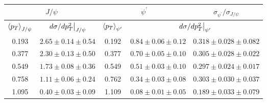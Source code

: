 \begin{tabular}{cc|ccc}
\hline
\multicolumn{2}{c|}{$J/\psi$}                     & \multicolumn{2}{c|}{$\psi^{\prime}$}                                   & $\sigma_{\psi^\prime}/\sigma_{J/\psi}$ \\ \hline
$\expval{p_T}_{J/\psi}$ & $\eval{d\sigma/dp_T^2}_{J/\psi}$ & $\expval{p_T}_{\psi^\prime}$ & \multicolumn{2}{c}{$\eval{d\sigma/dp_T^2}_{\psi^\prime}$} \\ \hline
\multicolumn{1}{c|}{0.193} & $2.65\pm0.14\pm0.54$ & \multicolumn{1}{c|}{0.192} & \multicolumn{1}{c|}{$0.84\pm0.06\pm0.12$} & $0.318\pm0.028\pm0.082$                \\
\multicolumn{1}{c|}{0.377} & $2.30\pm0.13\pm0.50$ & \multicolumn{1}{c|}{0.377} & \multicolumn{1}{c|}{$0.70\pm0.05\pm0.10$} & $0.305\pm0.028\pm0.022$                \\
\multicolumn{1}{c|}{0.549} & $1.73\pm0.08\pm0.36$ & \multicolumn{1}{c|}{0.549} & \multicolumn{1}{c|}{$0.51\pm0.03\pm0.10$} & $0.297\pm0.024\pm0.017$                \\
\multicolumn{1}{c|}{0.758} & $1.11\pm0.06\pm0.24$ & \multicolumn{1}{c|}{0.762} & \multicolumn{1}{c|}{$0.34\pm0.03\pm0.08$} & $0.303\pm0.030\pm0.037$                \\
\multicolumn{1}{c|}{1.095} & $0.40\pm0.03\pm0.09$ & \multicolumn{1}{c|}{1.109} & \multicolumn{1}{c|}{$0.08\pm0.01\pm0.05$} & $0.189\pm0.033\pm0.079$                \\ \hline
\end{tabular}
